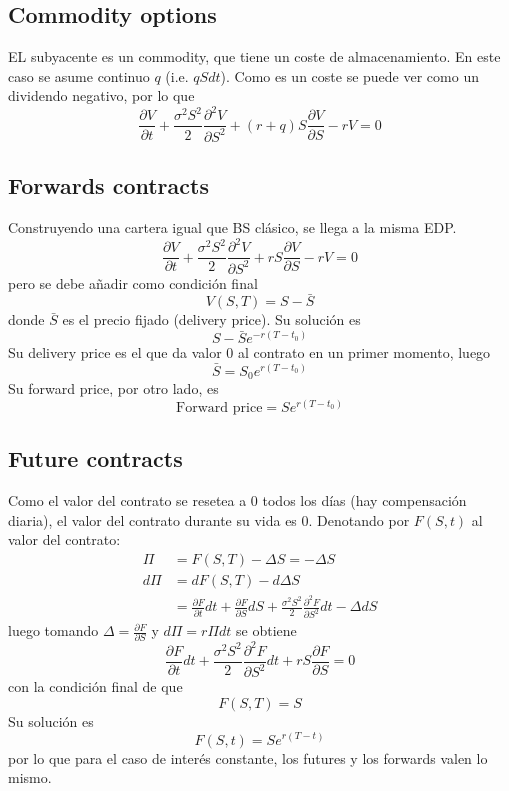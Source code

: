 \subsection{Commodity options}
EL subyacente es un commodity, que tiene un coste de almacenamiento. En este caso se asume continuo $q$ (i.e. $qSdt$). Como es un coste se puede ver como un dividendo negativo, por lo que
\[
\boxed{\frac{\partial V}{\partial t} + \frac{\sigma^2S^2}{2} \frac{\partial^2 V}{\partial S^2} + (r+q)S \frac{\partial V}{\partial S} -rV = 0}
\]




\subsection{Forwards contracts}
Construyendo una cartera igual que BS clásico, se llega a la misma EDP.%
\[
\boxed{\frac{\partial V}{\partial t} + \frac{\sigma^2S^2}{2} \frac{\partial^2 V}{\partial S^2} + rS \frac{\partial V}{\partial S} -rV = 0}
\]
pero se debe añadir como condición final
\[\boxed{V(S,T)=S-\bar{S}}\]
donde $\bar{S}$ es el precio fijado (delivery price). Su solución es
\[
\boxed{S-\bar{S}e^{-r(T-t_0)}}
\]
Su delivery price es el que da valor 0 al contrato en un primer momento, luego 
\[
\bar{S} = S_0e^{r(T-t_0)}
\]
Su forward price, por otro lado, es  
\[
\text{Forward price} = Se^{r(T-t_0)}
\]




\subsection{Future contracts}
Como el valor del contrato se resetea a 0 todos los días (hay compensación diaria), el valor del contrato durante su vida es 0. Denotando por $F(S,t)$ al valor del contrato:
\begin{align*}
    \Pi &= F(S,T) - \Delta S = - \Delta S \\
    d\Pi &= dF(S,T) - d\Delta S \\
    &= \frac{\partial F}{\partial t}dt + \frac{\partial F}{\partial S}dS + \frac{\sigma^2S^2}{2} \frac{\partial^2 F}{\partial S^2}dt - \Delta dS
\end{align*}
luego tomando $\Delta = \frac{\partial F}{\partial S}$ y $d\Pi=r\Pi dt$ se obtiene
\[
\boxed{\frac{\partial F}{\partial t}dt + \frac{\sigma^2S^2}{2} \frac{\partial^2 F}{\partial S^2}dt + rS\frac{\partial F}{\partial S} = 0}
\]
con la condición final de que
\[
\boxed{F(S,T) = S}
\]
Su solución es
\[\boxed{F(S,t) = Se^{r(T-t)}}\]
por lo que para el caso de interés constante, los futures y los forwards valen lo mismo.






